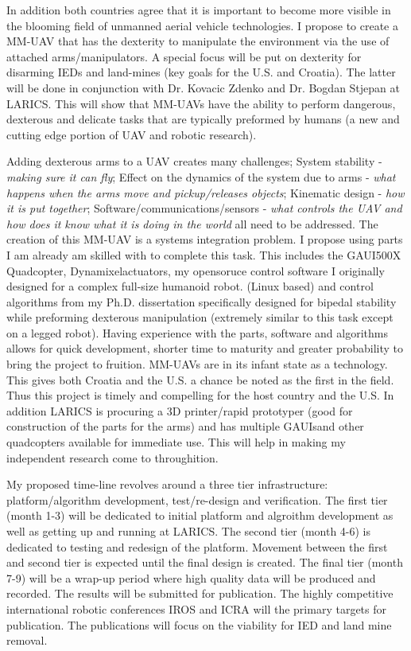 \documentclass[12pt]{article}
\begin{document}
In addition both countries agree that it is important to become more visible in the blooming field of unmanned aerial vehicle technologies.
I propose to create a MM-UAV that has the dexterity to manipulate the environment via the use of attached  arms/manipulators. 
A special focus will be put on dexterity for disarming IEDs and land-mines (key goals for the U.S. and Croatia).  
The latter will be done in conjunction with Dr. Kovacic Zdenko and Dr. Bogdan Stjepan at LARICS.  
This will show that MM-UAVs have the ability to perform dangerous, dexterous and delicate tasks that are typically preformed by humans (a new and cutting edge portion of UAV and robotic research).

Adding dexterous arms to a UAV creates many challenges; 
System stability -  \textit{making sure it can fly};
Effect on the dynamics of the system due to arms - \textit{what happens when the arms move and pickup/releases objects};
Kinematic design -  \textit{how it is put together};
Software/communications/sensors -  \textit{what controls the UAV and how does it know what it is doing in the world} all need to be addressed.  
The creation of this MM-UAV is a systems integration problem.  
I propose using parts I am already am skilled with to complete this task.
This includes the GAUI\texttrademark 500X Quadcopter, Dynamixel\texttrademark actuators, my opensoruce control software I originally designed for a complex full-size humanoid robot.
(Linux based) and control algorithms from my Ph.D. dissertation specifically designed for bipedal stability while preforming dexterous manipulation (extremely similar to this task except on a legged robot).  
Having experience with the parts, software and algorithms allows for quick development, shorter time to maturity and greater probability to bring the project to fruition.  
MM-UAVs are in its infant state as a technology.
This gives both Croatia and the U.S. a chance be noted as the first in the field.
Thus this project is timely and compelling for the host country and the U.S.  
In addition LARICS is procuring a 3D printer/rapid prototyper (good for construction of the parts for the arms) and has multiple GAUIs\texttrademark and other quadcopters available for immediate use.  This will help in making my independent research come to throughition.

My proposed time-line revolves around a three tier infrastructure: platform/algorithm development, test/re-design and verification.  
The first tier (month 1-3) will be dedicated to initial platform and algroithm development as well as getting up and running at LARICS.  
The second tier (month 4-6) is dedicated to testing and redesign of the platform.  
Movement between the first and second tier is expected until the final design is created.
The final tier (month 7-9) will be a wrap-up period where high quality data will be produced and recorded.
The results will be submitted for publication.  
The highly competitive international robotic conferences IROS and ICRA will the primary targets for publication.  
The publications will focus on the viability for IED and land mine removal.
\end{document}
